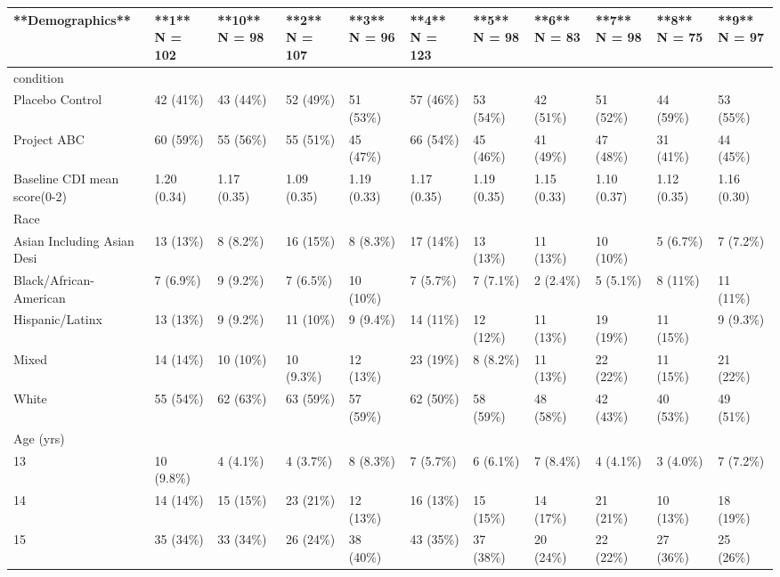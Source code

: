 \begin{table}[ht]
\centering
\begin{tabular}{lllllllllll}
  \hline
**Demographics** & **1**  
N = 102 & **10**  
N = 98 & **2**  
N = 107 & **3**  
N = 96 & **4**  
N = 123 & **5**  
N = 98 & **6**  
N = 83 & **7**  
N = 98 & **8**  
N = 75 & **9**  
N = 97 \\ 
  \hline
condition &  &  &  &  &  &  &  &  &  &  \\ 
  Placebo Control & 42 (41\%) & 43 (44\%) & 52 (49\%) & 51 (53\%) & 57 (46\%) & 53 (54\%) & 42 (51\%) & 51 (52\%) & 44 (59\%) & 53 (55\%) \\ 
  Project ABC & 60 (59\%) & 55 (56\%) & 55 (51\%) & 45 (47\%) & 66 (54\%) & 45 (46\%) & 41 (49\%) & 47 (48\%) & 31 (41\%) & 44 (45\%) \\ 
  Baseline CDI mean score(0-2) & 1.20 (0.34) & 1.17 (0.35) & 1.09 (0.35) & 1.19 (0.33) & 1.17 (0.35) & 1.19 (0.35) & 1.15 (0.33) & 1.10 (0.37) & 1.12 (0.35) & 1.16 (0.30) \\ 
  Race &  &  &  &  &  &  &  &  &  &  \\ 
  Asian Including Asian Desi & 13 (13\%) & 8 (8.2\%) & 16 (15\%) & 8 (8.3\%) & 17 (14\%) & 13 (13\%) & 11 (13\%) & 10 (10\%) & 5 (6.7\%) & 7 (7.2\%) \\ 
  Black/African-American & 7 (6.9\%) & 9 (9.2\%) & 7 (6.5\%) & 10 (10\%) & 7 (5.7\%) & 7 (7.1\%) & 2 (2.4\%) & 5 (5.1\%) & 8 (11\%) & 11 (11\%) \\ 
  Hispanic/Latinx & 13 (13\%) & 9 (9.2\%) & 11 (10\%) & 9 (9.4\%) & 14 (11\%) & 12 (12\%) & 11 (13\%) & 19 (19\%) & 11 (15\%) & 9 (9.3\%) \\ 
  Mixed & 14 (14\%) & 10 (10\%) & 10 (9.3\%) & 12 (13\%) & 23 (19\%) & 8 (8.2\%) & 11 (13\%) & 22 (22\%) & 11 (15\%) & 21 (22\%) \\ 
  White & 55 (54\%) & 62 (63\%) & 63 (59\%) & 57 (59\%) & 62 (50\%) & 58 (59\%) & 48 (58\%) & 42 (43\%) & 40 (53\%) & 49 (51\%) \\ 
  Age (yrs) &  &  &  &  &  &  &  &  &  &  \\ 
  13 & 10 (9.8\%) & 4 (4.1\%) & 4 (3.7\%) & 8 (8.3\%) & 7 (5.7\%) & 6 (6.1\%) & 7 (8.4\%) & 4 (4.1\%) & 3 (4.0\%) & 7 (7.2\%) \\ 
  14 & 14 (14\%) & 15 (15\%) & 23 (21\%) & 12 (13\%) & 16 (13\%) & 15 (15\%) & 14 (17\%) & 21 (21\%) & 10 (13\%) & 18 (19\%) \\ 
  15 & 35 (34\%) & 33 (34\%) & 26 (24\%) & 38 (40\%) & 43 (35\%) & 37 (38\%) & 20 (24\%) & 22 (22\%) & 27 (36\%) & 25 (26\%) \\ 

\end{tabular}
\end{table}
